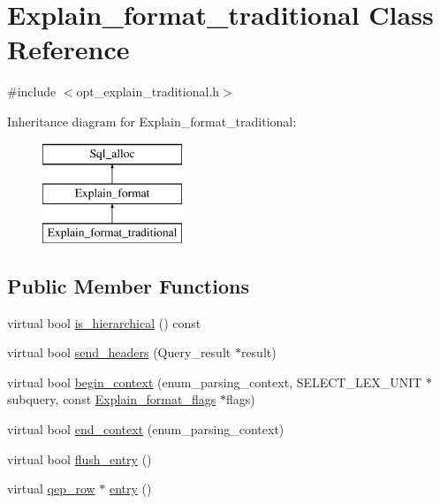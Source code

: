 \hypertarget{classExplain__format__traditional}{}\section{Explain\+\_\+format\+\_\+traditional Class Reference}
\label{classExplain__format__traditional}


{\ttfamily \#include $<$opt\+\_\+explain\+\_\+traditional.\+h$>$}

Inheritance diagram for Explain\+\_\+format\+\_\+traditional\+:\begin{figure}[H]
\begin{center}
\leavevmode
\includegraphics[height=3.000000cm]{classExplain__format__traditional}
\end{center}
\end{figure}
\subsection*{Public Member Functions}
\begin{DoxyCompactItemize}
\item 
virtual bool \mbox{\hyperlink{classExplain__format__traditional_a8861c3fd3ab2ed3523a0c1fcaa172645}{is\+\_\+hierarchical}} () const
\item 
virtual bool \mbox{\hyperlink{classExplain__format__traditional_ae6c12bfd12a99873ea63fc791515eb24}{send\+\_\+headers}} (Query\+\_\+result $\ast$result)
\item 
virtual bool \mbox{\hyperlink{classExplain__format__traditional_a6919bd25e9feb9954a2fa4f06c8a4f5c}{begin\+\_\+context}} (enum\+\_\+parsing\+\_\+context, S\+E\+L\+E\+C\+T\+\_\+\+L\+E\+X\+\_\+\+U\+N\+IT $\ast$subquery, const \mbox{\hyperlink{classExplain__format__flags}{Explain\+\_\+format\+\_\+flags}} $\ast$flags)
\item 
virtual bool \mbox{\hyperlink{classExplain__format__traditional_ae8a5ab39ea6b91a4100b2d60a32f4043}{end\+\_\+context}} (enum\+\_\+parsing\+\_\+context)
\item 
virtual bool \mbox{\hyperlink{classExplain__format__traditional_a991e2af5a82b9f25cee94564ee4c7000}{flush\+\_\+entry}} ()
\item 
virtual \mbox{\hyperlink{classqep__row}{qep\+\_\+row}} $\ast$ \mbox{\hyperlink{classExplain__format__traditional_a33fdef7dec07e61f4b0f098b768e01d9}{entry}} ()
\end{DoxyCompactItemize}
